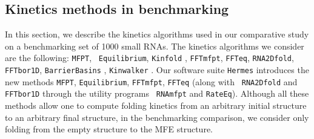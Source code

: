 \subsection*{Kinetics methods in benchmarking}

In this section, we describe the kinetics algorithms used in our
comparative study on a benchmarking set of 1000 small RNAs. The
kinetics algorithms we consider are the following: {\tt MFPT}, {\tt
Equilibrium}, {\tt Kinfold} \cite{flamm}, {\tt FFTmfpt}, {\tt FFTeq},
{\tt RNA2Dfold}, {\tt FFTbor1D}, {\tt BarrierBasins}
\cite{wolfingerStadler:kinetics}, {\tt Kinwalker} \cite{Geis.jmb08}.
Our software suite {\tt Hermes} introduces the new methods {\tt MFPT},
{\tt Equilibrium}, {\tt FFTmfpt}, {\tt FFTeq} (along with {\tt
RNA2Dfold} and {\tt FFTbor1D} through the utility programs {\tt
RNAmfpt} and {\tt RateEq}). Although all these methods allow one to
compute folding kinetics from an arbitrary initial structure to an
arbitrary final structure, in the benchmarking comparison, we consider
only folding from the empty structure to the MFE structure.
